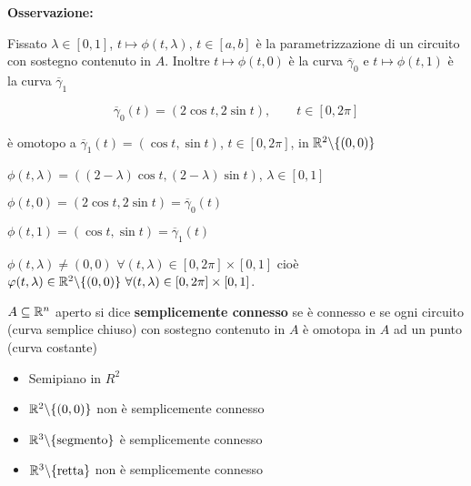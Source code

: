 \textbf{Osservazione:}

Fissato $\lambda \in[0,1]$, $t \mapsto \phi(t,\lambda)$, $t \in [a,b]$ è la parametrizzazione di un circuito con sostegno contenuto  in $A$. Inoltre  $t \mapsto \phi(t,0)$ è la curva $\overline{\gamma}_0$ e $t \mapsto \phi(t,1)$ è la curva $\overline{\gamma}_1$
	
	
\begin{exbar}
\begin{example}
	$$\overline{\gamma}_0 (t)=(2\cos t , 2 \sin t), \qquad t\in [0,2\pi]$$
	
	è omotopo a $\overline{\gamma}_1(t)=(\cos t , \sin t)$, $t \in [0,2\pi]$, in $\mathbb{R}^2\backslash \{(0,0)\}$
	
	$\phi(t,\lambda)=((2-\lambda)\cos t, (2-\lambda)\sin t)$,  $\lambda \in [0,1]$
	
	$\phi (t,0) =(2\cos t, 2 \sin t)=\overline{\gamma}_0 (t)$
	
	$\phi(t,1)=(\cos t , \sin t)=\overline{\gamma}_1(t)$
	
	$\phi(t,\lambda) \neq (0,0) \,\, \forall (t,\lambda)\in [0,2\pi]\times[0,1]$ cioè $\varphi(t,\lambda) \in \mathbb{R}^2 \backslash \{(0,0)\}\,\, \forall (t,\lambda)\in[0,2\pi]\times [0,1]$.
\end{example}
\end{exbar}


\begin{definition}
	$A \subseteq \mathbb{R}^n$ aperto si dice \textbf{semplicemente connesso} se è connesso e se ogni circuito  {\color{blue}(curva semplice chiuso)} con sostegno contenuto in $A$ è omotopa in $A$ ad un punto {\color{blue}(curva costante)}
\end{definition}
	
	
\begin{exbar}
\begin{example}
		\begin{itemize}
			\item Semipiano in $R^2$
			
			\segnaposto %
			
			\item $\mathbb{R}^2 \backslash \{(0,0)\}$ non è semplicemente connesso
			
			\segnaposto %
			
			\item $\mathbb{R}^3 \backslash \{\text{segmento}\}$ è semplicemente connesso
			
			\segnaposto %
			
			\item $\mathbb{R}^3 \backslash \{\text{retta}\}$ non è semplicemente connesso
			
			\segnaposto %
		\end{itemize}
\end{example}
\end{exbar}
	
